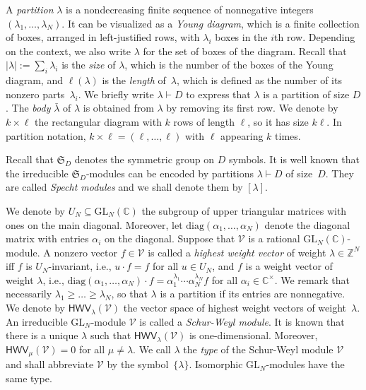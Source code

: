 \documentclass[11pt]{amsart}
\def\C{\mathbb{C}}
\def\GL{\mathrm{GL}}
\def\la{\lambda}
\def\diag{\mathrm{diag}}
\newcommand{\IC}{\ensuremath{\mathbb{C}}}
\newcommand{\IZ}{\ensuremath{\mathbb{Z}}}
\newcommand{\aS}{\ensuremath{\mathfrak{S}}}
\newcommand{\sV}{\ensuremath{\mathscr{V}}}
\newcommand{\HWV}{\mathsf{HWV}}
\numberwithin{equation}{section}
\begin{document}
A {\em partition} $\la$ is a nondecreasing finite sequence of nonnegative integers $(\la_1,\ldots,\la_N)$. 
It can be visualized as a {\em Young diagram}, 
which is a finite collection of boxes, arranged in left-justified rows, 
with $\la_i$ boxes in the $i$th row. Depending on the context, 
we also write $\la$ for the set of boxes of the diagram. 
Recall that 
$|\la| := \sum_i \la_i$ is the {\em size} of $\la$, 
which is the number of the boxes of the Young diagram, 
and $\ell(\la)$ is the {\em length} of~$\la$, which is defined as 
the number of its nonzero parts~$\la_i$.
We briefly write $\la \vdash D$ to express that $\la$ is a partition of size $D$. 
The {\em body} $\bar\la$ of $\la$ is obtained from $\la$
by removing its first row. 
We denote by 
$k\times\ell$ the rectangular diagram with $k$ rows 
of length $\ell$, so it has size $k\ell$. 
In partition notation, 
$k\times\ell = (\ell,\ldots,\ell)$ with $\ell$ appearing $k$ times. 

Recall that $\aS_D$ denotes the symmetric group on $D$ symbols. 
It is well known that the irreducible $\aS_D$-modules can be encoded 
by partitions $\la\vdash D$ of size~$D$. They are called {\em Specht modules}  
and we shall denote them by $[\la]$. 


We denote by $U_N\subseteq \GL_N(\C)$ the subgroup of upper triangular matrices with ones on the main diagonal.
Moreover, let $\diag(\alpha_1,\ldots,\alpha_N)$ denote the diagonal matrix with entries $\alpha_i$
on the diagonal.
Suppose that $\sV$ is a rational $\GL_N(\C)$-module. 
A nonzero vector $f \in \sV$ is called a \emph{highest weight vector} of weight $\la\in\IZ^N$ iff 
$f$ is $U_N$-invariant, i.e., $u \cdot f = f$ for all $u \in U_N$, 
and $f$ is a weight vector of weight $\la$, i.e.,
$\diag(\alpha_1,\ldots,\alpha_N)\cdot f = \alpha_1^{\la_1} \cdots \alpha_N^{\la_N} f$ 
for all $\alpha_i \in\IC^\times$. 
We remark that necessarily $\la_1\ge\ldots\ge\la_N$, 
so that $\la$ is a partition if its entries are nonnegative. 
We denote by $\HWV_\la(\sV)$ the vector space of highest weight vectors of weight~$\la$.
An irreducible  $\GL_N$-module $\sV$ is called a {\em Schur-Weyl module}.
It is known that there is a unique $\la$ such that 
$\HWV_\la(\sV)$ is one-dimensional. Moreover, $\HWV_\mu(\sV)=0$ for all $\mu\ne\la$. 
We call $\la$ the {\em type} of the Schur-Weyl module $\sV$
and shall abbreviate $\sV$ by the symbol~$\{\la\}$. 
Isomorphic $\GL_N$-modules have the same type.
\end{document}
